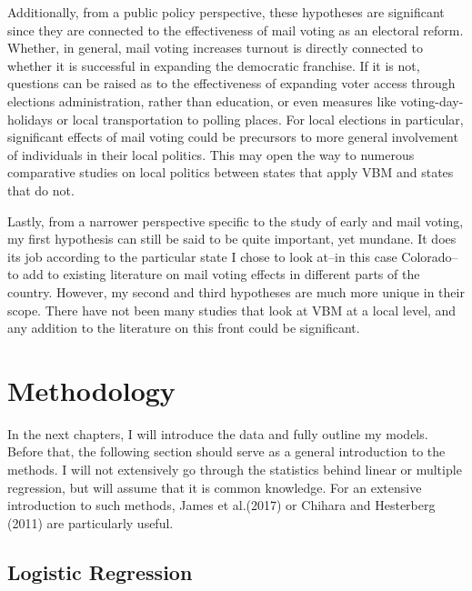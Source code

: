 \documentclass[12pt,twoside]{reedthesis}
\begin{document}
  Additionally, from a public policy perspective, these hypotheses are
  significant since they are connected to the effectiveness of mail voting
  as an electoral reform. Whether, in general, mail voting increases
  turnout is directly connected to whether it is successful in expanding
  the democratic franchise. If it is not, questions can be raised as to
  the effectiveness of expanding voter access through elections
  administration, rather than education, or even measures like
  voting-day-holidays or local transportation to polling places. For local
  elections in particular, significant effects of mail voting could be
  precursors to more general involvement of individuals in their local
  politics. This may open the way to numerous comparative studies on local
  politics between states that apply VBM and states that do not.
  
  Lastly, from a narrower perspective specific to the study of early and
  mail voting, my first hypothesis can still be said to be quite
  important, yet mundane. It does its job according to the particular
  state I chose to look at--in this case Colorado--to add to existing
  literature on mail voting effects in different parts of the country.
  However, my second and third hypotheses are much more unique in their
  scope. There have not been many studies that look at VBM at a local
  level, and any addition to the literature on this front could be
  significant.
  
  \section{Methodology}\label{methodology}
  
  In the next chapters, I will introduce the data and fully outline my
  models. Before that, the following section should serve as a general
  introduction to the methods. I will not extensively go through the
  statistics behind linear or multiple regression, but will assume that it
  is common knowledge. For an extensive introduction to such methods,
  James et al.(2017) or Chihara and Hesterberg (2011) are particularly
  useful.
  
  \subsection{Logistic Regression}\label{logistic-regression}
  
\end{document}
